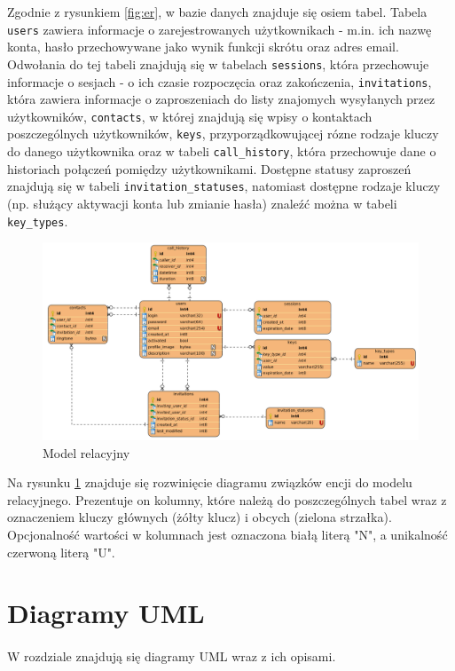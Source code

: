 \documentclass{article}
\begin{document}
    Zgodnie z rysunkiem \ref{fig:er}, w bazie danych znajduje się osiem tabel. Tabela \texttt{users} zawiera informacje o zarejestrowanych użytkownikach - m.in. ich nazwę konta, hasło przechowywane jako wynik funkcji skrótu oraz adres email. Odwołania do tej tabeli znajdują się w tabelach \texttt{sessions}, która przechowuje informacje o sesjach - o ich czasie rozpoczęcia oraz zakończenia, \texttt{invitations}, która zawiera informacje o zaproszeniach do listy znajomych wysyłanych przez użytkowników, \texttt{contacts}, w której znajdują się wpisy o kontaktach poszczególnych użytkowników, \texttt{keys}, przyporządkowującej rózne rodzaje kluczy do danego użytkownika oraz w tabeli \texttt{call\_history}, która przechowuje dane o historiach połączeń pomiędzy użytkownikami. Dostępne statusy zaproszeń znajdują się w tabeli \texttt{invitation\_statuses}, natomiast dostępne rodzaje kluczy (np. służący aktywacji konta lub zmianie hasła) znaleźć można w tabeli \texttt{key\_types}.

    \begin{figure}[H]
      \centering
        \includegraphics[width=1.0\linewidth]{assets/rel.png}
        \caption[]{Model relacyjny}
        \label{fig:rel}
    \end{figure}

    Na rysunku \ref{fig:rel} znajduje się rozwinięcie diagramu związków encji do modelu relacyjnego. Prezentuje on kolumny, które należą do poszczególnych tabel wraz z oznaczeniem kluczy głównych (żółty klucz) i obcych (zielona strzałka). Opcjonalność wartości w kolumnach jest oznaczona białą literą "N", a unikalność czerwoną literą "U".

    \section{Diagramy UML}
    \paragraph{} W rozdziale znajdują się diagramy UML wraz z ich opisami.
\end{document}
